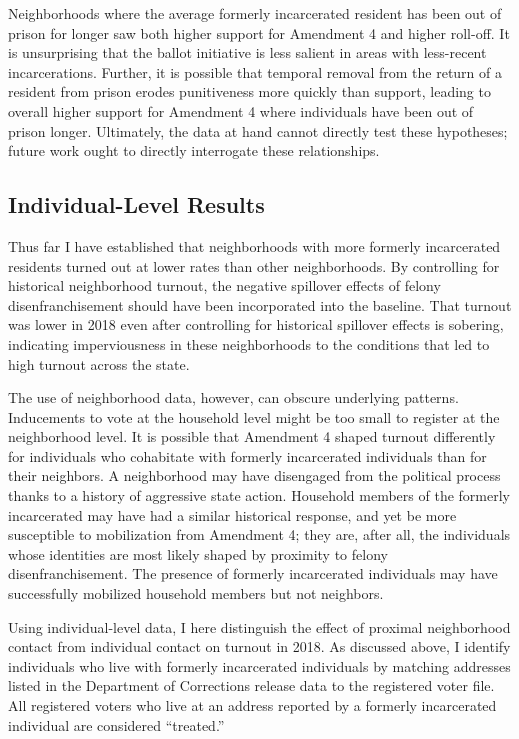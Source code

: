 \documentclass[
  12pt,
]{article}
\begin{document}
Neighborhoods where the average formerly incarcerated resident has been out of prison for longer saw both higher support for Amendment 4 and higher roll-off. It is unsurprising that the ballot initiative is less salient in areas with less-recent incarcerations. Further, it is possible that temporal removal from the return of a resident from prison erodes punitiveness more quickly than support, leading to overall higher support for Amendment 4 where individuals have been out of prison longer. Ultimately, the data at hand cannot directly test these hypotheses; future work ought to directly interrogate these relationships.

\hypertarget{individual-level-results}{%
\subsection*{Individual-Level Results}\label{individual-level-results}}

Thus far I have established that neighborhoods with more formerly incarcerated residents turned out at lower rates than other neighborhoods. By controlling for historical neighborhood turnout, the negative spillover effects of felony disenfranchisement should have been incorporated into the baseline. That turnout was lower in 2018 even after controlling for historical spillover effects is sobering, indicating imperviousness in these neighborhoods to the conditions that led to high turnout across the state.

The use of neighborhood data, however, can obscure underlying patterns. Inducements to vote at the household level might be too small to register at the neighborhood level. It is possible that Amendment 4 shaped turnout differently for individuals who cohabitate with formerly incarcerated individuals than for their neighbors. A neighborhood may have disengaged from the political process thanks to a history of aggressive state action. Household members of the formerly incarcerated may have had a similar historical response, and yet be more susceptible to mobilization from Amendment 4; they are, after all, the individuals whose identities are most likely shaped by proximity to felony disenfranchisement. The presence of formerly incarcerated individuals may have successfully mobilized household members but not neighbors.

Using individual-level data, I here distinguish the effect of proximal neighborhood contact from individual contact on turnout in 2018. As discussed above, I identify individuals who live with formerly incarcerated individuals by matching addresses listed in the Department of Corrections release data to the registered voter file. All registered voters who live at an address reported by a formerly incarcerated individual are considered ``treated.''
\end{document}
